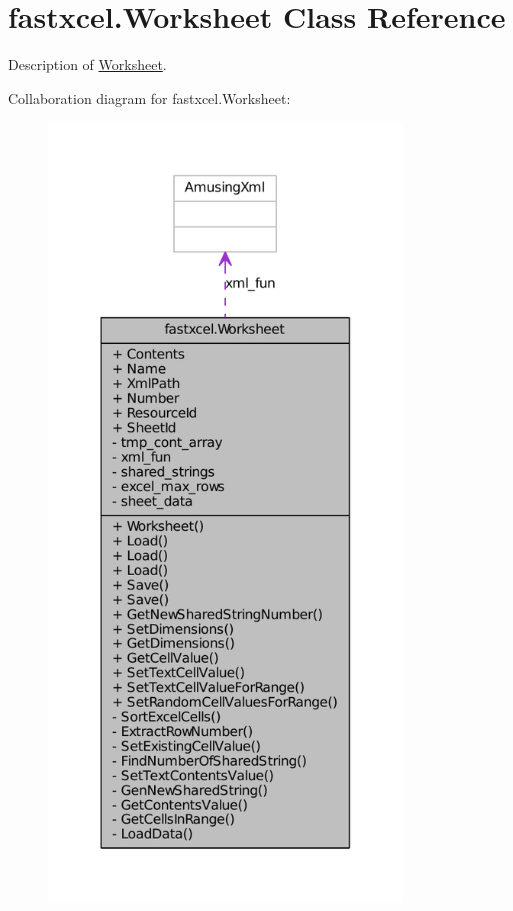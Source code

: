 \hypertarget{classfastxcel_1_1_worksheet}{
\section{fastxcel.Worksheet Class Reference}
\label{classfastxcel_1_1_worksheet}
}


Description of \hyperlink{classfastxcel_1_1_worksheet}{Worksheet}.  




Collaboration diagram for fastxcel.Worksheet:\nopagebreak
\begin{figure}[H]
\begin{center}
\leavevmode
\includegraphics[width=266pt]{classfastxcel_1_1_worksheet__coll__graph}
\end{center}
\end{figure}

